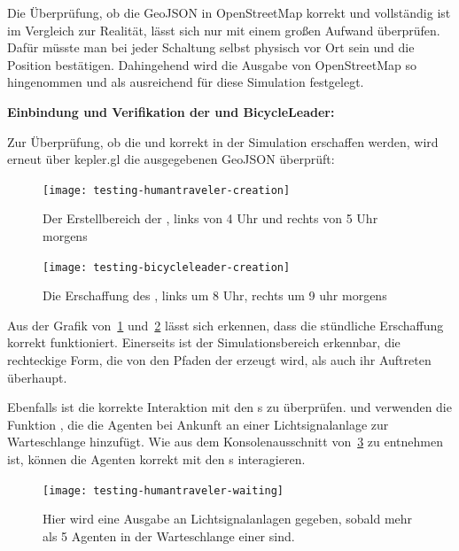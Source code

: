 Die Überprüfung, ob die GeoJSON in OpenStreetMap korrekt und vollständig ist im Vergleich zur Realität, lässt sich nur mit einem großen Aufwand überprüfen.
Dafür müsste man bei jeder Schaltung selbst physisch vor Ort sein und die Position bestätigen.
Dahingehend wird die Ausgabe von OpenStreetMap so hingenommen und als ausreichend für diese Simulation festgelegt.

\textbf{Einbindung und Verifikation der  und {BicycleLeader}:}

Zur Überprüfung, ob die  und  korrekt in der Simulation erschaffen werden, wird erneut über kepler.gl die ausgegebenen GeoJSON überprüft:

\begin{figure}[h]
    \centering
    \texttt{[image: testing-humantraveler-creation]}~\caption{Der Erstellbereich der , links von 4 Uhr und rechts von 5 Uhr morgens}
    \label{fig:spawning-human-traveler}
\end{figure}

\begin{figure}[h]
    \centering
    \texttt{[image: testing-bicycleleader-creation]}~\caption{Die Erschaffung des , links um 8 Uhr, rechts um 9 uhr morgens}
    \label{fig:spawning-bicycle-leader}
\end{figure}

Aus der Grafik von~\ref{fig:spawning-human-traveler} und~\ref{fig:spawning-bicycle-leader} lässt sich erkennen, dass die stündliche Erschaffung korrekt funktioniert.
Einerseits ist der Simulationsbereich erkennbar, die rechteckige Form, die von den Pfaden der  erzeugt wird, als auch ihr Auftreten überhaupt.

Ebenfalls ist die korrekte Interaktion mit den s zu überprüfen.
 und  verwenden die Funktion , die die Agenten bei Ankunft an einer Lichtsignalanlage zur Warteschlange hinzufügt.
Wie aus dem Konsolenausschnitt von~\ref{fig:waiting-at-traffic-light-humantraveler} zu entnehmen ist, können die Agenten korrekt mit den s interagieren.

\begin{figure}[h]
    \centering
    \texttt{[image: testing-humantraveler-waiting]}~\caption{Hier wird eine Ausgabe an Lichtsignalanlagen gegeben, sobald mehr als 5 Agenten in der Warteschlange einer  sind.}
    \label{fig:waiting-at-traffic-light-humantraveler}
\end{figure}

